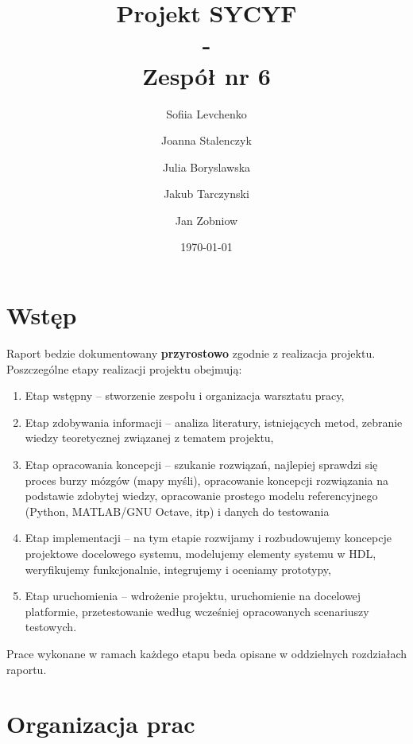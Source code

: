 \documentclass[a4paper,titleauthor]{mwart}
\title{{\Huge  Projekt SYCYF}\\ - \\{\Large Zespół nr 6}\\ }
\author{Sofiia Levchenko \and Joanna Stalenczyk \and Julia Boryslawska \and Jakub Tarczynski \and Jan Zobniow}
\date{\today}
\begin{document}
	
	
	\maketitle
	\tableofcontents
	
	\section{Wstęp}
	\label{sec:wstep}%
	
	Raport bedzie dokumentowany \textbf{przyrostowo} zgodnie z realizacja projektu. Poszczególne etapy realizacji projektu obejmują: 
	
	\renewcommand{\labelenumi}{\Roman{enumi}}
	\begin{enumerate}\setlength{\itemsep}{0.2\baselineskip} 
		\item Etap wstępny – stworzenie zespołu i organizacja warsztatu pracy, 
		\item Etap zdobywania informacji – analiza literatury, istniejących metod, zebranie wiedzy teoretycznej związanej z tematem projektu, 
		\item Etap opracowania koncepcji – szukanie rozwiązań, najlepiej sprawdzi się proces burzy mózgów (mapy myśli), opracowanie koncepcji rozwiązania  na podstawie zdobytej wiedzy, opracowanie prostego modelu referencyjnego (Python, MATLAB/GNU Octave, itp) i danych do testowania  
		\item Etap implementacji – na tym etapie rozwijamy i rozbudowujemy koncepcje projektowe docelowego systemu, modelujemy elementy systemu w HDL, weryfikujemy funkcjonalnie, integrujemy i oceniamy prototypy, 
		\item Etap uruchomienia – wdrożenie projektu, uruchomienie na docelowej platformie, przetestowanie według wcześniej opracowanych scenariuszy testowych. 
	\end{enumerate}
	
	Prace wykonane w ramach każdego etapu beda opisane w oddzielnych rozdziałach raportu.
	
	\section{Organizacja prac}
	\label{sec:organizacja}
	
\end{document}
